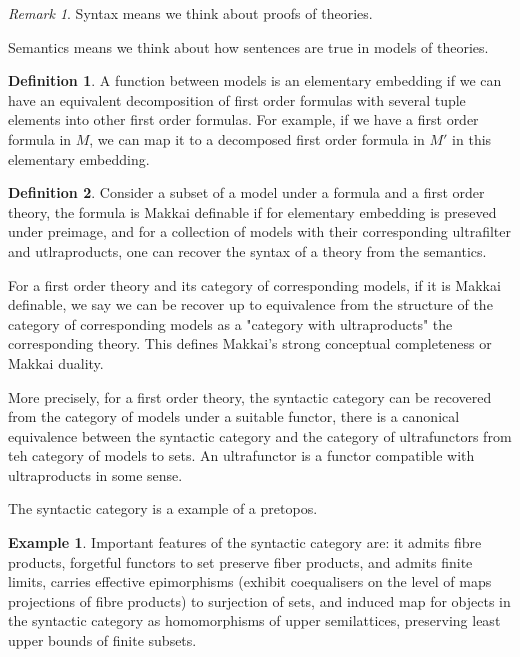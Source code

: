 \documentclass[10pt]{article}
\theoremstyle{plain}%
\theoremstyle{definition}
\newtheorem{definition}{Definition}[section]
\newtheorem{example}{Example}[section]
\theoremstyle{remark}
\newtheorem*{remark}{Remark}
\begin{document}
\begin{remark}
	Syntax means we think about proofs of theories.

	Semantics means we think about how sentences are true in models of theories.
\end{remark}

\begin{definition}
	A function between models is an elementary embedding if we can have an equivalent decomposition of first order formulas with several tuple elements into other first order formulas. For example, if we have a first order formula in $M$, we can map it to a decomposed first order formula in $M'$ in this elementary embedding.
\end{definition}

\begin{definition}
	Consider a subset of a model under a formula and a first order theory, the formula is Makkai definable if for elementary embedding is preseved under preimage, and for a collection of models with their corresponding ultrafilter and utlraproducts, one can recover the syntax of a theory from the semantics.

	For a first order theory and its category of corresponding models, if it is Makkai definable, we say we can be recover up to equivalence from the structure of the category of corresponding models as a "category with ultraproducts" the corresponding theory. This defines Makkai's strong conceptual completeness or Makkai duality.

	More precisely, for a first order theory, the syntactic category can be recovered from the category of models under a suitable functor, there is a canonical equivalence between the syntactic category and the category of ultrafunctors from teh category of models to sets. An ultrafunctor is a functor compatible with ultraproducts in some sense.
	 
	The syntactic category is a example of a pretopos.
\end{definition}

\begin{example}
	Important features of the syntactic category are: it admits fibre products, forgetful functors to set preserve fiber products, and admits finite limits, carries effective epimorphisms (exhibit coequalisers on the level of maps projections of fibre products) to surjection of sets, and induced map for objects in the syntactic category as homomorphisms of upper semilattices, preserving least upper bounds of finite subsets.
\end{example}
\end{document}
